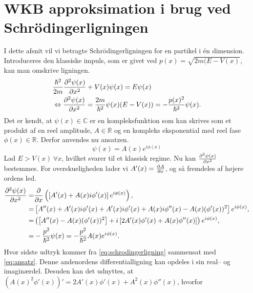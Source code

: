 
\section{WKB approksimation i brug ved Schrödingerligningen}
I dette afsnit vil vi betragte Schrödingerligningen for en partikel i én dimension. Introduceres den klassiske impuls, som er givet ved $p(x) = \sqrt{2m(E-V(x)}$, kan man omskrive ligningen.
%
\begin{align}
    & \frac{\hbar^2}{2m} \pdiff[2]{\psi(x)}{x} + V(x)\psi(x) = E\psi(x) \\
    & \Leftrightarrow \pdiff[2]{\psi(x)}{x} = \frac{2m}{\hbar^2}\psi(x)(E - V(x))  = - \frac{p(x)^2}{\hbar^2}\psi(x).
    \label{eq:schrodingerligning}
\end{align}
%
Det er kendt, at $\psi(x) \in \mathbb{C}$ er en kompleksfunktion som kan skrives som et produkt af en reel amplitude, $A \in \mathbb{R}$ og en kompleks eksponential med reel fase $\phi(x)\in \mathbb{R}$. Derfor anvendes nu ansatzen.
\begin{equation}
    \psi(x) = A(x) e^{i \phi(x)}
    \label{eq:ansatz}
\end{equation}
Lad $E > V(x) \ \forall x$, hvilket svarer til et klassisk regime.
Nu kan $\pdiff[2]{\psi(x)}{x}$ bestemmes. For overskueligheden lader vi $A'(x) = \pdiff{A}{x}$, og så fremdeles af højere ordens led.
\begin{align}
    \pdiff[2]{\psi(x)}{x} = & \pdiff{}{x}\left( \left[ A'(x) + A(x)i\phi'(x) \right]e^{i\phi(x)} \right), \\
    = & \left[ A''(x) + A'(x)i\phi'(x) + A'(x)i\phi'(x) + A(x)i\phi''(x) - A(x)( \phi'(x))^2\right]e^{i\phi(x)}, \\
    = & \left(\left[ A''(x) - A(x)(\phi'(x))^2\right] + i \left[2A'(x)\phi'(x) + A(x)\phi''(x) \right]\right)e^{i\phi(x)},\\
    = & -\frac{p^2}{\hbar^2}\psi(x) = -\frac{p^2}{\hbar^2} A(x)e^{i\phi(x)}.
    \label{eq:regime}
\end{align}
Hvor sidste udtryk kommer fra \cref{eq:schrodingerligning} sammensat med \cref{eq:ansatz}.
Denne andenordens differentialligning kan opdeles i sin real-- og imaginærdel. Desuden kan det udnyttes, at $\left( A(x)^2\phi'(x) \right)' = 2A'(x)\phi'(x) + A^2(x)\phi''(x)$, hvorfor

